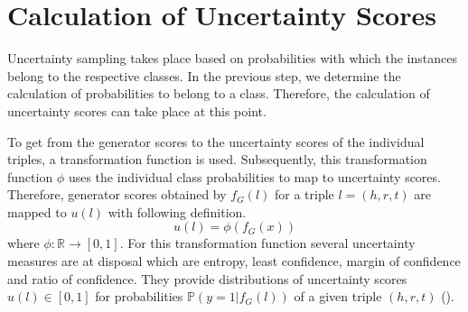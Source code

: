 \section{Calculation of Uncertainty Scores}
\label{sec:calculation_of_uncertainty_scores}
%
Uncertainty sampling takes place based on probabilities with which the instances belong to the respective classes.
In the previous step, we determine the calculation of probabilities to belong to a class.
Therefore, the calculation of uncertainty scores can take place at this point.

To get from the generator scores to the uncertainty scores of the individual triples, a transformation function is used.
Subsequently, this transformation function $\phi$ uses the individual class probabilities to map to uncertainty scores.
Therefore, generator scores obtained by $f_G(l)$ for a triple $l = (h,r,t)$ are  mapped to $u(l)$ with following definition.
\begin{equation} \label{eqn:uncertainty_function}
    u(l) = \phi(f_G(x))
\end{equation}
where $\phi: \mathbb{R} \rightarrow [0,1]$.
For this transformation function several uncertainty measures are at disposal which are entropy, least confidence, margin of confidence and ratio of confidence.
They provide distributions of uncertainty scores $u(l) \in [0, 1]$ for probabilities $\mathbb{P}(y = 1 | f_G(l))$ of a given triple $(h, r, t)$ ().
\clearpage
